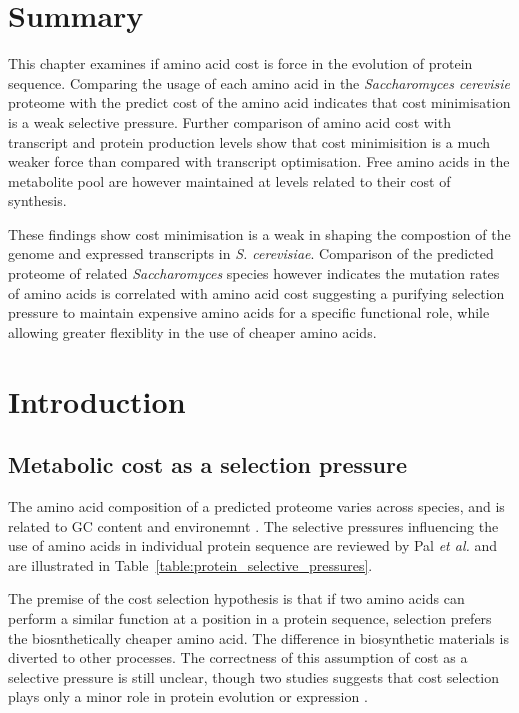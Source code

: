 \section*{Summary}

This chapter examines if amino acid cost is force in the evolution of protein sequence. Comparing the usage of each amino acid in the \emph{Saccharomyces cerevisie} proteome with the predict cost of the amino acid indicates that cost minimisation is a weak selective pressure. Further comparison of amino acid cost with transcript and protein production levels show that cost minimisition is a much weaker force than compared with transcript optimisation. Free amino acids in the metabolite pool are however maintained at levels related to their cost of synthesis.

These findings show cost minimisation is a weak in shaping the compostion of the genome and expressed transcripts in \emph{S. cerevisiae}. Comparison of the predicted proteome of related \emph{Saccharomyces} species however indicates the mutation rates of amino acids is correlated with amino acid cost suggesting a purifying selection pressure to maintain expensive amino acids for a specific functional role, while allowing greater flexiblity in the use of cheaper amino acids.

\clearpage

\section{Introduction}

\subsection{Metabolic cost as a selection pressure}

The amino acid composition of a predicted proteome varies across species, and is related to GC content and environemnt \cite{tekaia2006}. The selective pressures influencing the use of amino acids in individual protein sequence are reviewed by Pal \emph{et al.} \cite{pal2006} and are illustrated in Table~\vref{table:protein_selective_pressures}.

The premise of the cost selection hypothesis \cite{akashi2002} is that if two amino acids can perform a similar function at a position in a protein sequence, selection prefers the biosnthetically cheaper amino acid. The difference in biosynthetic materials is diverted to other processes. The correctness of this assumption of cost as a selective pressure is still unclear, though two studies suggests that cost selection plays only a minor role in protein evolution \cite{rocha2004} or expression \cite{raiford2008}.

